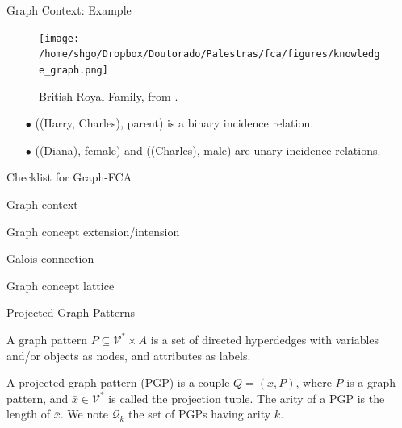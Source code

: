 \documentclass[pdf,xcolor=table]{beamer}
\newcommand{\cmark}{\ding{51}}%
\newcommand{\done}{\rlap{$\square$}{\raisebox{2pt}{\large\hspace{1pt}\cmark}}%
\hspace{-2.5pt}}
\begin{document}
\begin{frame}[t]{Graph Context: Example}
    \begin{figure}[h]
        \texttt{[image: /home/shgo/Dropbox/Doutorado/Palestras/fca/figures/knowledge\_graph.png]}
        \caption{British Royal Family, from \cite{Ferre2015}.}
    \end{figure}
    \begin{itemize}
        \item[$\bullet$] ((Harry, Charles), parent) is a binary incidence relation.
        \item[$\bullet$] ((Diana), female) and ((Charles), male) are unary incidence relations.
    \end{itemize}
\end{frame}

\begin{frame}[t]{Checklist for Graph-FCA}
    \begin{todolist}
        \item[\done] Graph context
        \item Graph concept extension/intension
        \item Galois connection
        \item Graph concept lattice                
    \end{todolist}
\end{frame}

\begin{frame}[t]{Projected Graph Patterns}
    \begin{definition}
        A graph pattern $P \subseteq \mathcal{V}^* \times A$ is a set of directed hyperdedges with variables and/or objects as nodes, and attributes as labels.
    \end{definition}
    \begin{definition}
        A projected graph pattern (PGP) is a couple $Q = (\bar x, P)$, where $P$ is a graph pattern, and $\bar x \in \mathcal{V}^*$ is called the projection tuple.
        The arity of a PGP is the length of $\bar x$.
        We note $\mathcal{Q}_k$ the set of PGPs having arity $k$.
    \end{definition}
\end{frame}
\end{document}
